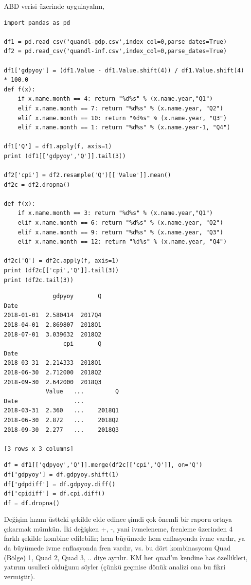 \documentclass[12pt,fleqn]{article}\usepackage{../../common}
\begin{document}
ABD verisi üzerinde uygulayalım,

\begin{verbatim}
import pandas as pd

df1 = pd.read_csv('quandl-gdp.csv',index_col=0,parse_dates=True)
df2 = pd.read_csv('quandl-inf.csv',index_col=0,parse_dates=True)

df1['gdpyoy'] = (df1.Value - df1.Value.shift(4)) / df1.Value.shift(4) * 100.0
def f(x):
    if x.name.month == 4: return "%d%s" % (x.name.year,"Q1")
    elif x.name.month == 7: return "%d%s" % (x.name.year, "Q2")
    elif x.name.month == 10: return "%d%s" % (x.name.year, "Q3")
    elif x.name.month == 1: return "%d%s" % (x.name.year-1, "Q4")

df1['Q'] = df1.apply(f, axis=1)
print (df1[['gdpyoy','Q']].tail(3))

df2['cpi'] = df2.resample('Q')[['Value']].mean()
df2c = df2.dropna()

def f(x):
    if x.name.month == 3: return "%d%s" % (x.name.year,"Q1")
    elif x.name.month == 6: return "%d%s" % (x.name.year, "Q2")
    elif x.name.month == 9: return "%d%s" % (x.name.year, "Q3")
    elif x.name.month == 12: return "%d%s" % (x.name.year, "Q4")

df2c['Q'] = df2c.apply(f, axis=1)
print (df2c[['cpi','Q']].tail(3))
print (df2c.tail(3))
\end{verbatim}

\begin{verbatim}
              gdpyoy       Q
Date                        
2018-01-01  2.580414  2017Q4
2018-04-01  2.869807  2018Q1
2018-07-01  3.039632  2018Q2
                 cpi       Q
Date                        
2018-03-31  2.214333  2018Q1
2018-06-30  2.712000  2018Q2
2018-09-30  2.642000  2018Q3
            Value   ...         Q
Date                ...          
2018-03-31  2.360   ...    2018Q1
2018-06-30  2.872   ...    2018Q2
2018-09-30  2.277   ...    2018Q3

[3 rows x 3 columns]
\end{verbatim}

\begin{verbatim}
df = df1[['gdpyoy','Q']].merge(df2c[['cpi','Q']], on='Q')
df['gdpyoy'] = df.gdpyoy.shift(1)
df['gdpdiff'] = df.gdpyoy.diff()
df['cpidiff'] = df.cpi.diff()
df = df.dropna()
\end{verbatim}

Değişim hızını üstteki şekilde elde edince şimdi çok önemli bir raporu ortaya
çıkarmak mümkün. İki değişken +, -, yani ivmeleneme, frenleme üzerinden 4 farklı
şekilde kombine edilebilir; hem büyümede hem enflasyonda ivme vardır, ya da
büyümede ivme enflasyonda fren vardır, vs. bu dört kombinasyonu Quad (Bölge) 1,
Quad 2, Quad 3, .. diye ayrılır. KM her quad'ın kendine has özellikleri, yatırım
usulleri olduğunu söyler (çünkü geçmise dönük analizi ona bu fikri vermiştir).
\end{document}
